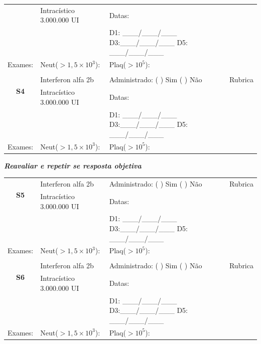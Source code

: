 \documentclass[11pt,a4paper,oldfontcommands]{memoir}
\begin{document}
\begin{center}
\begin{table}[H]
\begin{tabular}{p{1.3cm}p{4.2cm}|p{8cm}|p{}}
    \multicolumn{1}{c|}{}&{Intracístico 3.000.000 UI}&{Datas:}&\\
    \multicolumn{1}{c|}{}&{}&{D1: \_\_\_/\_\_\_/\_\_\_ D3:\_\_\_/\_\_\_/\_\_\_ D5: \_\_\_/\_\_\_/\_\_\_}&\\
    \hline
    {Exames:}&{Neut(\(>1,5\times10^3\)):}&{Plaq(\(>10^5\)):}&{}
    \\
    \hline
    \\
    \hline
    \multicolumn{1}{c|}{\multirow{2}{*}{\textbf{S4}}}&{Interferon alfa 2b}&{Administrado: (  ) Sim (  ) Não}&{Rubrica}\\
    \multicolumn{1}{c|}{}&{Intracístico 3.000.000 UI}&{Datas:}&\\
    \multicolumn{1}{c|}{}&{}&{D1: \_\_\_/\_\_\_/\_\_\_ D3:\_\_\_/\_\_\_/\_\_\_ D5: \_\_\_/\_\_\_/\_\_\_}&\\
    \hline
    {Exames:}&{Neut(\(>1,5\times10^3\)):}&{Plaq(\(>10^5\)):}&{}
    \\
    \hline
\end{tabular}
\end{table}
\textbf{\textit{Reavaliar e repetir se resposta objetiva}}
\begin{table}[H]
\begin{tabular}{p{1.3cm}p{4.2cm}|p{8cm}|p{}}
    \hline
    \multicolumn{1}{c|}{\multirow{2}{*}{\textbf{S5}}}&{Interferon alfa 2b}&{Administrado: (  ) Sim (  ) Não}&{Rubrica}\\
    \multicolumn{1}{c|}{}&{Intracístico 3.000.000 UI}&{Datas:}&\\
    \multicolumn{1}{c|}{}&{}&{D1: \_\_\_/\_\_\_/\_\_\_ D3:\_\_\_/\_\_\_/\_\_\_ D5: \_\_\_/\_\_\_/\_\_\_}&\\
    \hline
    {Exames:}&{Neut(\(>1,5\times10^3\)):}&{Plaq(\(>10^5\)):}&{}
    \\
    \hline
    \\
    \hline
    \multicolumn{1}{c|}{\multirow{2}{*}{\textbf{S6}}}&{Interferon alfa 2b}&{Administrado: (  ) Sim (  ) Não}&{Rubrica}\\
    \multicolumn{1}{c|}{}&{Intracístico 3.000.000 UI}&{Datas:}&\\
    \multicolumn{1}{c|}{}&{}&{D1: \_\_\_/\_\_\_/\_\_\_ D3:\_\_\_/\_\_\_/\_\_\_ D5: \_\_\_/\_\_\_/\_\_\_}&\\
    \hline
    {Exames:}&{Neut(\(>1,5\times10^3\)):}&{Plaq(\(>10^5\)):}&{}
    \\
    \hline
\end{tabular}
\end{table}
\begin{table}[H]

\end{table}
\end{center}
\end{document}
